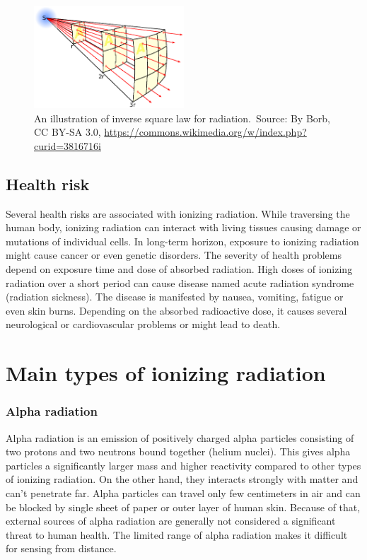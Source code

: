   \begin{figure}[!h]
    \centering
      \includegraphics[width=0.5\textwidth]{./fig/photos/Inverse_square_law.eps}
    \caption{An illustration of inverse square law for radiation.\ Source: By Borb, CC BY-SA 3.0, \url{https://commons.wikimedia.org/w/index.php?curid=3816716i}}
      \label{fig:islaw}
  \end{figure}


\subsection{Health risk}%
Several health risks are associated with ionizing radiation.
While traversing the human body, ionizing radiation can interact with living tissues causing damage or mutations of individual cells.
In long-term horizon, exposure to ionizing radiation might cause cancer or even genetic disorders.
The severity of health problems depend on exposure time and dose of absorbed radiation.
High doses of ionizing radiation over a short period can cause disease named acute radiation syndrome (radiation sickness).
The disease is manifested by nausea, vomiting, fatigue or even skin burns. 
Depending on the absorbed radioactive dose, it causes several neurological or cardiovascular problems or might lead to death.%






\section{Main types of ionizing radiation}
\subsubsection{Alpha radiation}
Alpha radiation is an emission of positively charged alpha particles consisting of two protons and two neutrons bound together (helium nuclei).
This gives alpha particles a significantly larger mass and higher reactivity compared to other types of ionizing radiation.
On the other hand, they interacts strongly with matter and can't penetrate far.
Alpha particles can travel only few centimeters in air and can be blocked by single sheet of paper or outer layer of human skin.
Because of that, external sources of alpha radiation are generally not considered a significant threat to human health.
The limited range of alpha radiation makes it difficult for sensing from distance.

